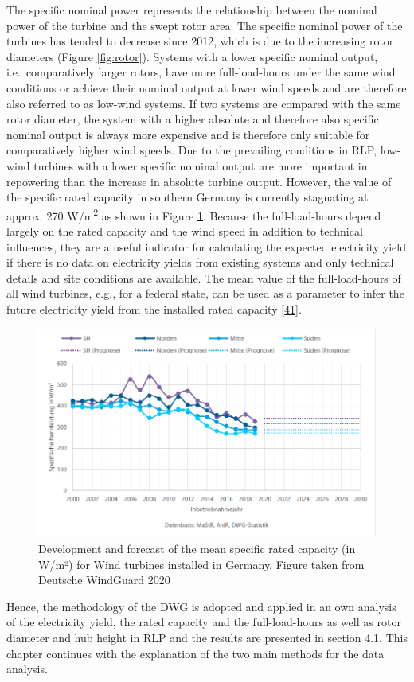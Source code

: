 \documentclass[a4paper,11pt]{article}
\begin{document}
The specific nominal power represents the relationship between the nominal power of the turbine and the swept rotor area. The specific nominal power of the turbines has tended to decrease since 2012, which is due to the increasing rotor diameters (Figure \ref{fig:rotor}). Systems with a lower specific nominal output, i.e.~comparatively larger rotors, have more full-load-hours under the same wind conditions or achieve their nominal output at lower wind speeds and are therefore also referred to as low-wind systems. If two systems are compared with the same rotor diameter, the system with a higher absolute and therefore also specific nominal output is always more expensive and is therefore only suitable for comparatively higher wind speeds. Due to the prevailing conditions in RLP, low-wind turbines with a lower specific nominal output are more important in repowering than the increase in absolute turbine output. However, the value of the specific rated capacity in southern Germany is currently stagnating at approx. 270 W/m\textsuperscript{2} as shown in Figure \ref{fig:spec}. Because the full-load-hours depend largely on the rated capacity and the wind speed in addition to technical influences, they are a useful indicator for calculating the expected electricity yield if there is no data on electricity yields from existing systems and only technical details and site conditions are available. The mean value of the full-load-hours of all wind turbines, e.g., for a federal state, can be used as a parameter to infer the future electricity yield from the installed rated capacity {[}\protect\hyperlink{ref-RasmusBorrmannDr.KnudRehfeldtDr.DennisKruse.2020}{41}{]}.
\begin{figure}[H]

{\centering \includegraphics[width=1\linewidth]{figures/DWG/DWG_Spezifische_Nennleistung} 

}

\caption{Development and forecast of the mean specific rated capacity (in W/m²) for Wind turbines installed in Germany. Figure taken from Deutsche WindGuard 2020}\label{fig:spec}
\end{figure}
Hence, the methodology of the DWG is adopted and applied in an own analysis of the electricity yield, the rated capacity and the full-load-hours as well as rotor diameter and hub height in RLP and the results are presented in section 4.1. This chapter continues with the explanation of the two main methods for the data analysis.
\end{document}
